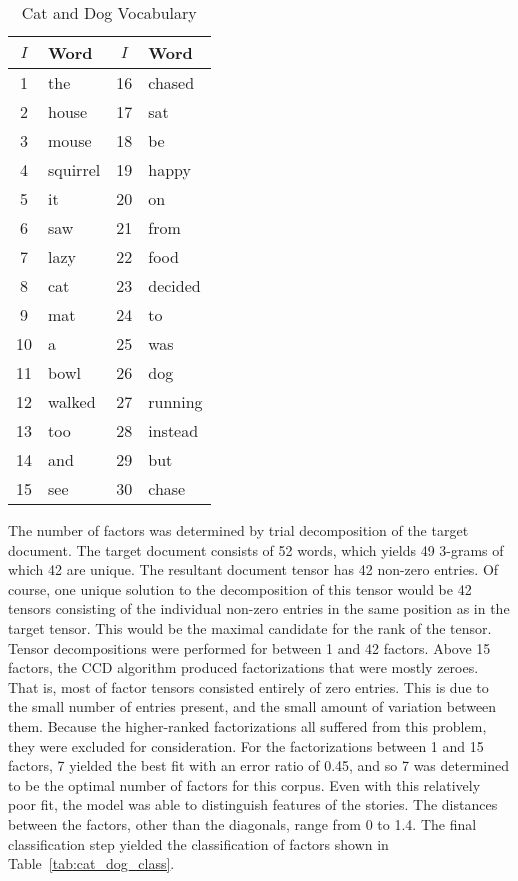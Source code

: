 \documentclass[../ut-dissertation.tex]{subfiles}
\begin{document}
\begin{table}[p]
  \centering
  \caption{Cat and Dog Vocabulary}\label{tab:catdog_vocabulary}
  \begin{tabular}{|c|l||c|l|}
    \hline
    $I$ & Word & $I$ & Word\\ 
    \hline
    1 & the & 16 & chased \\
    2 & house & 17 & sat \\
    3 & mouse & 18 & be \\
    4 & squirrel & 19 & happy \\
    5 & it & 20 & on\\
    6 & saw & 21 & from \\
    7 & lazy & 22 & food \\
    8 & cat & 23 & decided \\
    9 & mat & 24 & to\\
   10 & a & 25 & was \\
   11 & bowl & 26 & dog \\
   12 & walked & 27 & running \\
   13 & too & 28 & instead \\
   14 & and & 29 & but \\
   15 & see & 30 & chase\\
    \hline
  \end{tabular}
\end{table}
\FloatBarrier

The number of factors was determined by trial decomposition of the
target document.  The target document consists of 52 words, which
yields 49 3-grams of which 42 are unique.  The resultant document
tensor has 42 non-zero entries.  Of course, one unique solution to the
decomposition of this tensor would be 42 tensors consisting of the
individual non-zero entries in the same position as in the target
tensor.  This would be the maximal candidate for the rank of the
tensor.  Tensor decompositions were performed for between 1 and 42
factors.  Above 15 factors, the CCD algorithm produced factorizations
that were mostly zeroes.  That is, most of factor tensors consisted
entirely of zero entries.  This is due to the small number of entries
present, and the small amount of variation between them.  Because the
higher-ranked factorizations all suffered from this problem, they were
excluded for consideration.  For the factorizations between 1 and 15
factors, 7 yielded the best fit with an error ratio of 0.45, and so 7
was determined to be the optimal number of factors for this
corpus. Even with this relatively poor fit, the model was able to
distinguish features of the stories.  The distances between the
factors, other than the diagonals, range from 0 to 1.4.  The final
classification step yielded the classification of factors shown in
Table~\ref{tab:cat_dog_class}.
\end{document}
